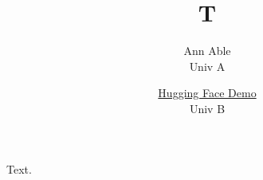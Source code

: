 \documentclass{article}
\title{T}
\author{Ann Able \\ Univ A \and \href{https://x.org/hf}{Hugging Face Demo} \\ Univ B}
\begin{document}
\maketitle
Text.
\end{document}
